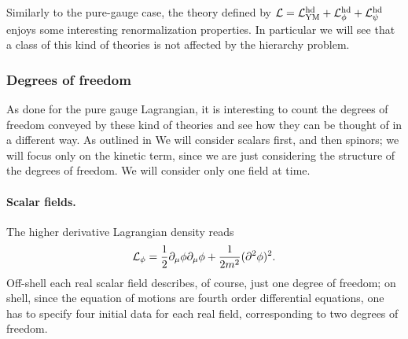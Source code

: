 Similarly to the pure-gauge case, the theory defined by 
\( { \mathcal{L} } =	{ \mathcal{L} }_{{ \text{YM} }}^{ \text{hd} } + { \mathcal{L} }^{ \text{hd} }_\phi + { \mathcal{L} }^{ \text{hd} }_\psi \)
enjoys some interesting renormalization properties. In particular we will see that a class of this kind of theories is not affected by the hierarchy problem.






\subsubsection{Degrees of freedom}

As done for the pure gauge Lagrangian, it is interesting to count the degrees of freedom conveyed by these kind of theories and see how they can be thought of in a different way. As outlined in \cite{CONFORMAL, Grinstein:2008qq}  We will consider scalars first, and then spinors; we will focus only on the kinetic term, since we are just considering the structure of the degrees of freedom.
We will consider only one field at time.

\paragraph{Scalar fields.} 
The higher derivative Lagrangian density reads
\begin{equation}
{ \mathcal{L} }_\phi = 
	\frac{1}{2} \partial_\mu \phi \partial_\mu \phi	
	+ \frac{1}{2 m^2} (\partial^2 \phi)^2.
\end{equation}
Off-shell each real scalar field describes, of course, just one degree of freedom; on shell, since the equation of motions are fourth order differential equations, one has to specify four initial data for each real field, corresponding to two degrees of freedom.

